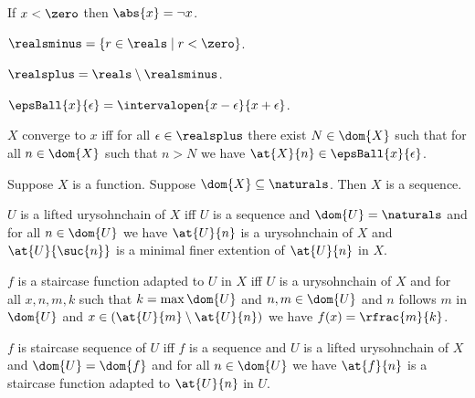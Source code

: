\begin{axiom}\label{abs_behavior2}
    If $x < \zero$ then $\abs{x} = \neg{x}$.
\end{axiom}

\begin{definition}\label{realsminus}
    $\realsminus = \{r \in \reals \mid r < \zero\}$.
\end{definition}

\begin{definition}\label{realsplus}
    $\realsplus = \reals \setminus \realsminus$.
\end{definition}

\begin{definition}\label{epsilon_ball}
    $\epsBall{x}{\epsilon} = \intervalopen{x-\epsilon}{x+\epsilon}$.
\end{definition}

\begin{definition}\label{pointwise_convergence}
    $X$ converge to $x$ iff for all $\epsilon \in \realsplus$ there exist $N \in \dom{X}$ such that for all $n \in \dom{X}$ such that $n > N$ we have $\at{X}{n} \in \epsBall{x}{\epsilon}$.
\end{definition}


\begin{proposition}\label{iff_sequence}
    Suppose $X$ is a function.
    Suppose $\dom{X} \subseteq \naturals$.
    Then $X$ is a sequence.
\end{proposition}

\begin{definition}\label{higher_urysohn_chain}
    $U$ is a lifted urysohnchain of $X$ iff $U$ is a sequence and $\dom{U} = \naturals$ and for all $n \in \dom{U}$ we have $\at{U}{n}$ is a urysohnchain of $X$ and $\at{U}{\suc{n}}$ is a minimal finer extention of $\at{U}{n}$ in $X$.
\end{definition}

\begin{definition}\label{staircase}
    $f$ is a staircase function adapted to $U$ in $X$ iff $U$ is a urysohnchain of $X$ and for all $x,n,m,k$ such that $k = \max{\dom{U}}$ and $n,m \in \dom{U}$ and $n$ follows $m$ in $\dom{U}$ and $x \in (\at{U}{m} \setminus \at{U}{n})$ we have $f(x)= \rfrac{m}{k}$.
\end{definition}

\begin{definition}\label{staircase_sequence}
    $f$ is staircase sequence of $U$ iff $f$ is a sequence and $U$ is a lifted urysohnchain of $X$ and $\dom{U} = \dom{f}$ and for all $n \in \dom{U}$ we have $\at{f}{n}$ is a staircase function adapted to $\at{U}{n}$ in $U$.
\end{definition}








